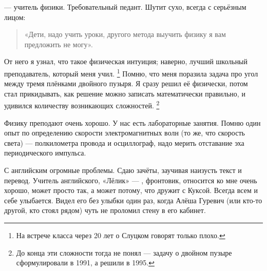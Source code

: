 \documentclass{book}
\begin{document}
 --- учитель физики.
Требовательный педант.
Шутит сухо, всегда с серьёзным лицом:
\begin{verse}
«Дети, надо учить уроки, другого метода выучить физику я вам предложить не могу».
\end{verse}
От него я узнал, что такое физическая интуиция;
наверно, лучший школьный преподаватель, который меня учил.%
\footnote{На встрече класса через 20 лет о Слуцком говорят только плохо.} 
Помню, что меня поразила задача про угол между тремя плёнками двойного пузыря.
Я сразу решил её физически, потом стал прикидывать, как решение можно записать математически правильно,
и удивился количеству возникающих сложностей.%
\footnote{До конца эти сложности тогда не понял --- задачу о двойном пузыре сформулировали в 1991, а решили в 1995.}

Физику преподают очень хорошо.
У нас есть лабораторные занятия.
Помню один опыт по определению скорости электромагнитных волн (то же, что скорость света)
---
полкилометра провода и осциллограф,
надо мерить отставание эха периодического импульса.

С английским огромные проблемы.
Сдаю зачёты, заучивая наизусть текст и перевод.
Учитель английского, «Лёлик» --- , фронтовик,
относится ко мне очень хорошо, 
может просто так, а может потому, что дружит с Куксой.
Всегда всем и себе улыбается.
Видел его без улыбки один раз,
когда Алёша Гуревич (или кто-то другой, кто стоял рядом) 
чуть не проломил стену в его кабинет.
\end{document}
